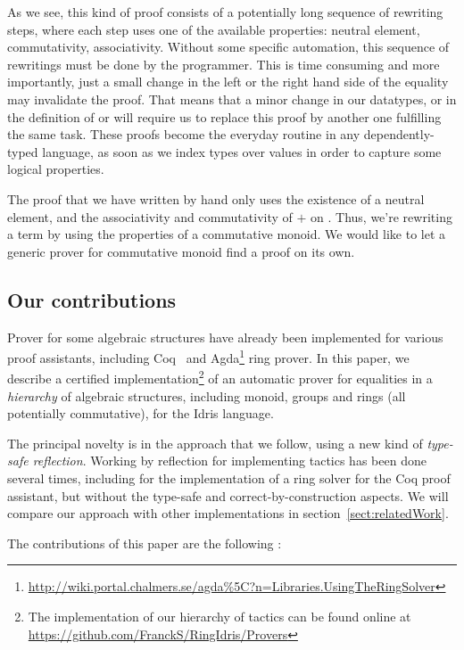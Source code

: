 As we see, this kind of proof consists of a potentially long sequence of rewriting steps, where each step uses one of the available properties: neutral element, commutativity, associativity. Without some specific automation, this sequence of rewritings must be done by the programmer.
This is time consuming and more importantly, just a small change in the left or the right hand side of the equality may invalidate the proof. That means that a minor change in our datatypes, or in the definition of  or  will require us to replace this proof by another one fulfilling the same task.
These proofs become the everyday routine in any dependently-typed language, as soon as we index types over values in order to capture some logical properties.  

The proof that we have written by hand only uses the existence of a neutral element, and the associativity and commutativity of $+$ on . Thus, we're rewriting a term by using the properties of a commutative monoid. We would like to let a generic prover for commutative monoid find a proof on its own.

\subsection{Our contributions}

Prover for some algebraic structures have already been implemented for various proof assistants, including Coq~\cite{Coq2005} and Agda\footnote{\url{http://wiki.portal.chalmers.se/agda\%5C?n=Libraries.UsingTheRingSolver}} ring prover. In this paper, we describe a certified
implementation\footnote{The implementation of our hierarchy of tactics can be found online at \url{https://github.com/FranckS/RingIdris/Provers}} of an automatic prover for equalities in a \emph{hierarchy} of algebraic
structures, including monoid, groups and rings (all potentially commutative),
for the Idris language. 

The principal novelty is in the approach that we follow, using a
new kind of \emph{type-safe reflection}.  Working by reflection for implementing tactics has been done several times, including for the implementation of a ring solver for the Coq proof assistant, but without the type-safe and correct-by-construction aspects. We will
compare our approach with other implementations in section~\ref{sect:relatedWork}.

The contributions of this paper are the following :

